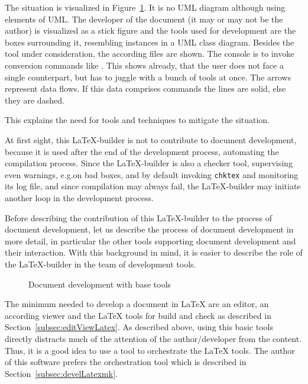 The situation is visualized in Figure~\ref{fig:docDevelBase}. 
It is no UML diagram although using elements of UML\@. 
The developer of the document (it may or may not be the author) 
is visualized as a stick figure 
and the tools used for development are the boxes surrounding it,
resembling instances in a UML class diagram. 
Besides the tool under consideration, the according files are shown. 
The console is to invoke conversion commands like \lualatex. 
This shows already, that the user does not face a single counterpart, 
but has to juggle with a bunch of tools at once. 
The arrows represent data flows. 
If this data comprises commands the lines are solid, else they are dashed. 

This explains the need for tools and techniques to mitigate the situation. 

At first sight, this \LaTeX-builder is not to contribute to document development, 
because it is used after the end of the development process, 
automating the compilation process. 
Since the \LaTeX-builder is also a checker tool, 
supervising even warnings, e.g.\@ on bad boxes, and by default invoking \texttt{chktex} 
and monitoring its log file, and since compilation may always fail, 
the \LaTeX-builder may initiate another loop in the development process. 

Before describing the contribution of this \LaTeX-builder 
to the process of document development, 
let us describe the process of document development in more detail, 
in particular the other tools supporting document development and their interaction. 
With this background in mind, it is easier to describe the role of the \LaTeX-builder 
in the team of development tools. 

\begin{figure}
  \centering
  \caption{\label{fig:docDevelBase}Document development with base tools}
\end{figure}

The minimum needed to develop a document in \LaTeX{} 
are an editor, an according viewer and the \LaTeX{} tools for build and check 
as described in Section~\ref{subsec:editViewLatex}. 
As described above, using this basic tools directly 
distracts much of the attention of the author/developer 
from the content. 
Thus, it is a good idea to use a tool to orchestrate the \LaTeX{} tools. 
The author of this software prefers the orchestration tool  
which is described in Section~\ref{subsec:develLatexmk}. 

